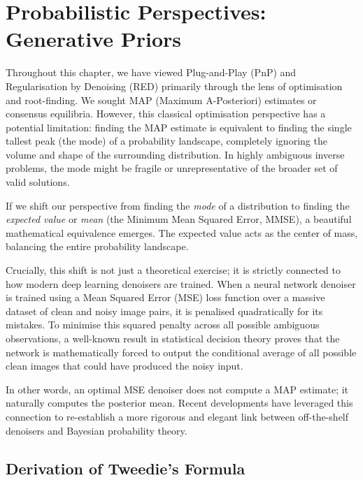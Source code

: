 \section{Probabilistic Perspectives: Generative Priors}
\label{sec:tweedie}

Throughout this chapter, we have viewed Plug-and-Play (PnP) and Regularisation by Denoising (RED) primarily through the lens of optimisation and root-finding. We sought MAP (Maximum A-Posteriori) estimates or consensus equilibria. However, this classical optimisation perspective has a potential limitation: finding the MAP estimate is equivalent to finding the single tallest peak (the mode) of a probability landscape, completely ignoring the volume and shape of the surrounding distribution. In highly ambiguous inverse problems, the mode might be fragile or unrepresentative of the broader set of valid solutions.

If we shift our perspective from finding the \emph{mode} of a distribution to finding the \emph{expected value} or \emph{mean} (the Minimum Mean Squared Error, MMSE), a beautiful mathematical equivalence emerges. The expected value acts as the center of mass, balancing the entire probability landscape. 

Crucially, this shift is not just a theoretical exercise; it is strictly connected to how modern deep learning denoisers are trained. When a neural network denoiser is trained using a Mean Squared Error (MSE) loss function over a massive dataset of clean and noisy image pairs, it is penalised quadratically for its mistakes. To minimise this squared penalty across all possible ambiguous observations, a well-known result in statistical decision theory proves that the network is mathematically forced to output the conditional average of all possible clean images that could have produced the noisy input. 

In other words, an optimal MSE denoiser does not compute a MAP estimate; it naturally computes the posterior mean. Recent developments \cite{milanfar2025denoising, tan2025solving} have leveraged this connection to re-establish a more rigorous and elegant link between off-the-shelf denoisers and Bayesian probability theory.

\subsection{Derivation of Tweedie's Formula}

